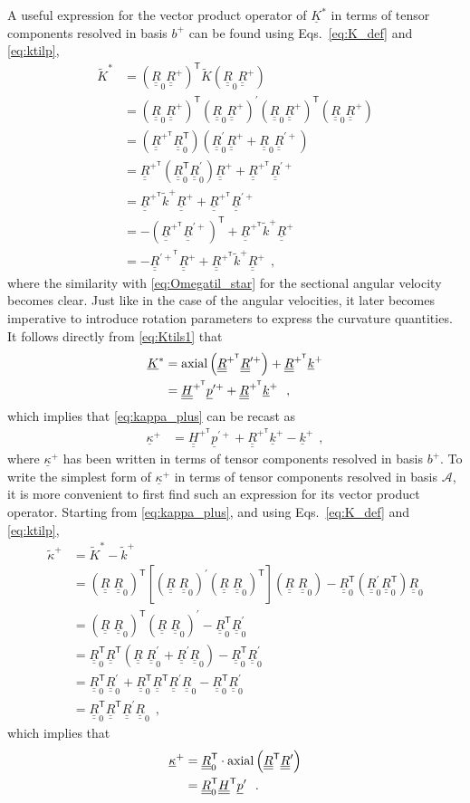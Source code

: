 \documentclass[12pt,a4paper,oneside,english]{abntex2} %
\newcommand{\vect}[1]{\underline{#1}}
\def\tens#1{\underline{\underline{#1}}}
\def\til#1{\widetilde{#1}}
\def\lb{\left[}
\def\rb{\right]}
\def\lp{\left(}
\def\rp{\right)}
\def\T{\mathsf{T}}
\def\A{\mathcal{A}}
\def\bp{b^+}
\def\axial{\textnormal{axial}}
\def\R{\tens{R}}
\def\RT{\R^\T}
\def\Rp{\R^+}
\def\RpT{\R^{+^\T}}
\def\Rprime{\R^{\prime}}
\def\Rpprime{\R^{\prime +}}
\def\RpprimeT{\R^{{\prime +}^\T}}
\def\Rz{\R_0}
\def\Rzp{\R^{\prime}_0}
\def\RzT{\R^\T_0}
\def\kap{\vect{\kappa}}
\def\kapp{\kap^{+}}
\def\kapptil{\til{\kappa}^{+}}
\def\k{\vect{k}}
\def\kp{\k^{+}}
\def\ktil{\til{k}}
\def\ktilp{\ktil^{+}}
\def\K{\vect{K}}
\def\Ks{\K^{*}}
\def\Ktil{\til{K}}
\def\Ktils{\Ktil^{*}}
\def\H{\tens{H}}
\def\HT{\H^\T}
\def\HpT{\H^{+^\T}}
\def\p{\vect{p}}
\def\pprime{\p^{\prime}}
\def\ppprime{\p^{\prime{+}}}
\begin{document}
A useful expression for the vector product operator of $\Ks$ in terms of tensor components resolved in basis $\bp$ can be found using Eqs.~\eqref{eq:K_def} and \eqref{eq:ktilp},
\begin{align}
    \Ktils 
    &= \lp\Rz\Rp\rp^\T\Ktil\lp\Rz\Rp\rp \nonumber 
    \\
    &= \lp\Rz\Rp\rp^\T\lp\Rz\Rp\rp^{\prime} \lp\Rz\Rp\rp^\T\lp\Rz\Rp\rp \nonumber
    \\
    &= \lp\RpT\RzT\rp \lp\Rzp\Rp+\Rz\Rpprime\rp \nonumber 
    \\
    &= \RpT\lp\RzT\Rzp\rp\Rp + \RpT\Rpprime \nonumber 
    \\
    &= \RpT\ktilp\Rp + \RpT\Rpprime \label{eq:Ktils1} 
    \\
    &= -\lp\RpT\Rpprime\rp^\T + \RpT\ktilp\Rp \nonumber 
    \\
    &= -\RpprimeT\Rp + \RpT\ktilp\Rp \ \ ,
    \label{eq:Ktils}
\end{align}
where the similarity with \cref{eq:Omegatil_star} for the sectional angular velocity becomes clear. Just like in the case of the angular velocities, it later becomes imperative to introduce rotation parameters to express the curvature quantities. It follows directly from \cref{eq:Ktils1} that
\begin{align}
    \Ks 
    &= \axial\lp\RpT\Rpprime\rp + \RpT\kp \nonumber 
    \\
    &= \HpT\ppprime + \RpT\kp \ \ ,
    \label{eq:Ks_rotpar}
\end{align}
which implies that \cref{eq:kappa_plus} can be recast as
\begin{align}
    \kapp &= \HpT\ppprime + \RpT\kp - \kp \ \ ,
    \label{eq:kappa_plus2}
\end{align}
where $\kapp$ has been written in terms of tensor components resolved in basis $\bp$. To write the simplest form of $\kapp$ in terms of tensor components resolved in basis $\A$, it is more convenient to first find such an expression for its vector product operator. Starting from \cref{eq:kappa_plus}, and using Eqs.~\eqref{eq:K_def} and \eqref{eq:ktilp}, 
\begin{align}
    \kapptil
    &= \Ktils - \ktilp \nonumber
    \\
    &= \lp\R\;\Rz\rp^\T\lb\lp\R\;\Rz\rp^\prime\lp\R\;\Rz\rp^\T\rb\lp\R\;\Rz\rp - \RzT\lp\Rzp\RzT\rp\Rz \nonumber 
    \\
    &= \lp\R\;\Rz\rp^\T\lp\R\;\Rz\rp^\prime - \RzT\Rzp \nonumber 
    \\
    &= \RzT\RT\lp\R\;\Rzp+\Rprime\Rz\rp - \RzT\Rzp \nonumber 
    \\
    &= \RzT\Rzp + \RzT\RT\Rprime\Rz - \RzT\Rzp \nonumber 
    \\
    &= \RzT\RT\Rprime\Rz \ \ ,
    \label{eq:kappatil_plus}
\end{align}
which implies that
\begin{align}
    \kapp
    &= \RzT \cdot \axial\lp\RT\Rprime\rp \nonumber 
    \\
    &= \RzT\HT\pprime \ \ .
    \label{eq:kappa_plus_A}
\end{align}
\end{document}
